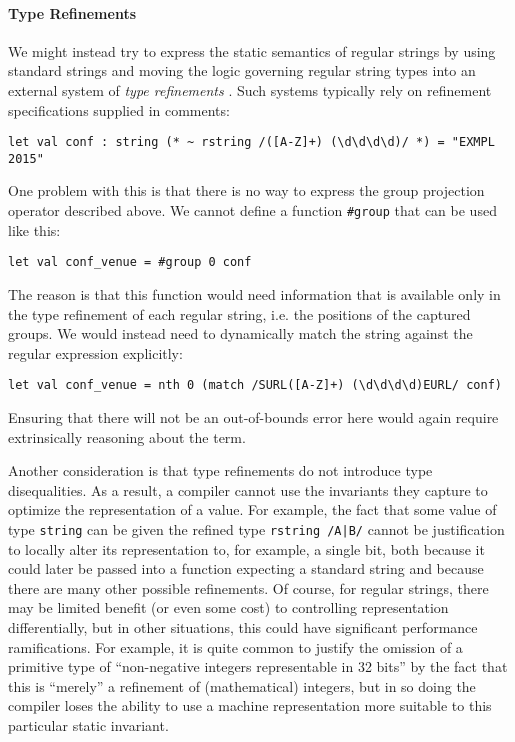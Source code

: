 \paragraph{Type Refinements}
We might instead try to express the static semantics of regular strings by using standard strings and moving the logic governing regular string types into an external system of \emph{type refinements}  \cite{Freeman91}. %
Such  systems typically rely on refinement specifications supplied in comments:
\begin{lstlisting}[numbers=none]
let val conf : string (* ~ rstring /([A-Z]+) (\d\d\d\d)/ *) = "EXMPL 2015"
\end{lstlisting}
One problem with this is that there is no way to express the group projection operator described above. We cannot define a function \lstinline{#group} that can be used like this:
\begin{lstlisting}[numbers=none]
let val conf_venue = #group 0 conf
\end{lstlisting}
The reason is that this function would need information that is  available only in the type refinement of each regular string, i.e. the positions of the captured groups. We would instead need to dynamically match the string against the regular expression explicitly:

\begin{lstlisting}[numbers=none]
let val conf_venue = nth 0 (match /SURL([A-Z]+) (\d\d\d\d)EURL/ conf)
\end{lstlisting}
Ensuring that there will not be an out-of-bounds error here would again require extrinsically reasoning about the term.

Another consideration is that type refinements do not introduce type disequalities. As a result, a compiler cannot use the invariants they capture to optimize the representation of a value. For example, the fact that some value of type \lstinline{string} can be given the refined type \lstinline{rstring /A|B/} cannot be justification to locally alter its representation to, for example, a single bit, both because it could later be passed into a function expecting a standard string and because there are many other possible refinements. Of course, for regular strings, there may be limited benefit (or even some cost) to controlling representation differentially, but in other situations, this could have significant performance ramifications. For example, it is quite common to justify the omission of a primitive type of ``non-negative integers representable in 32 bits'' by the fact that this is ``merely'' a refinement of (mathematical) integers, but in so doing the compiler loses the ability to use a machine representation more suitable to this particular static invariant.%

